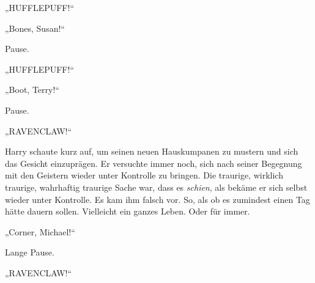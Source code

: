

„HUFFLEPUFF!“

„Bones, Susan!“

Pause.

„HUFFLEPUFF!“

„Boot, Terry!“

Pause.

„RAVENCLAW!“

Harry schaute kurz auf, um seinen neuen Hauskumpanen zu mustern und sich das Gesicht einzuprägen. Er versuchte immer noch, sich nach seiner Begegnung mit den Geistern wieder unter Kontrolle zu bringen. Die traurige, wirklich traurige, wahrhaftig traurige Sache war, dass es \emph{schien}, als bekäme er sich selbst wieder unter Kontrolle. Es kam ihm falsch vor. So, als ob es zumindest einen Tag hätte dauern sollen. Vielleicht ein ganzes Leben. Oder für immer.




„Corner, Michael!“

Lange Pause.

„RAVENCLAW!“

